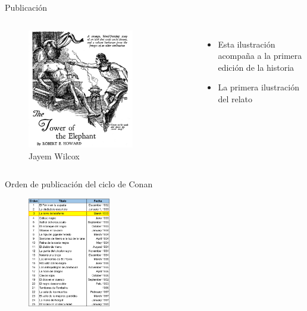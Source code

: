 \begin{frame}{Publicación}
	\begin{columns}
		\begin{figure}[htb]
			\centering
			\includegraphics[width=0.75\textwidth]{img/JayemWilcoxTowerOfTheElephant}
			\caption{Jayem Wilcox}
		\end{figure}
		\begin{itemize}
			\item Esta ilustración acompaña a la primera edición de la historia
			\item La primera ilustración del relato
		\end{itemize}
	\end{columns}
\end{frame}

\begin{frame}{Orden de publicación del ciclo de Conan}
\begin{figure}[htb]
  \centering
  \includegraphics[width=0.32\textwidth]{img/OrdenPublicacion}
\end{figure}
\end{frame}

